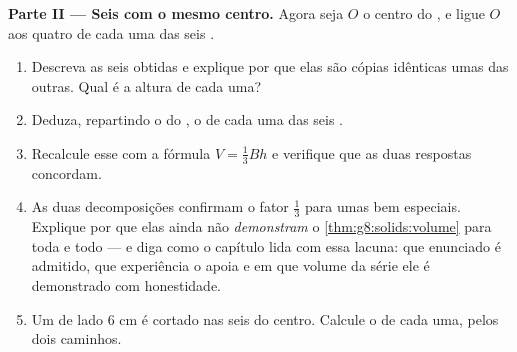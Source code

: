 \begin{problem}
\medskip
\noindent\textbf{Parte II --- Seis  com o mesmo centro.}
Agora seja $O$ o centro do , e ligue $O$ aos quatro  de
cada uma das seis .
\begin{enumerate}[resume]
  \item Descreva as seis  obtidas e explique por que elas são
        cópias idênticas umas das outras. Qual é a altura de cada uma?
  \item Deduza, repartindo o  do , o  de cada uma das
        seis .
  \item Recalcule esse  com a fórmula $V = \frac13 B h$ e
        verifique que as duas respostas concordam.
  \item As duas decomposições confirmam o fator $\frac13$ para umas
         bem especiais. Explique por que elas ainda não
        \emph{demonstram} o \cref{thm:g8:solids:volume} para toda
         e todo  --- e diga como o capítulo lida com essa
        lacuna: que enunciado é admitido, que experiência o apoia e em
        que volume da série ele é demonstrado com honestidade.
  \item Um  de lado $6$ cm é cortado nas seis  do centro.
        Calcule o  de cada uma, pelos dois caminhos.
\end{enumerate}


\end{problem}
